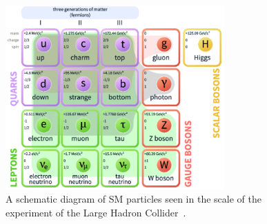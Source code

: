     \begin{figure}[!htb]
        \begin{center}
            \includegraphics[width=0.75\textwidth]{figures/chapter_SM/SM}
            \caption{
                A schematic diagram of SM particles seen in the scale of the experiment of the Large Hadron Collider~\cite{enwiki:1060203113}.
            }
            \label{fig:SM}
        \end{center}
    \end{figure}


%
%
%
%
%




